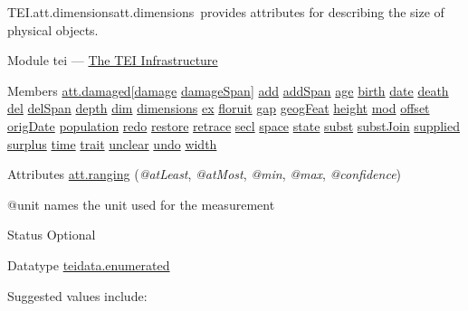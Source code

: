\begin{reflist}
\item[]\begin{specHead}{TEI.att.dimensions}{att.dimensions} provides attributes for describing the size of physical objects.\end{specHead} 
    \item[{Module}]
  tei — \hyperref[ST]{The TEI Infrastructure}
    \item[{Members}]
  \hyperref[TEI.att.damaged]{att.damaged}[\hyperref[TEI.damage]{damage} \hyperref[TEI.damageSpan]{damageSpan}] \hyperref[TEI.add]{add} \hyperref[TEI.addSpan]{addSpan} \hyperref[TEI.age]{age} \hyperref[TEI.birth]{birth} \hyperref[TEI.date]{date} \hyperref[TEI.death]{death} \hyperref[TEI.del]{del} \hyperref[TEI.delSpan]{delSpan} \hyperref[TEI.depth]{depth} \hyperref[TEI.dim]{dim} \hyperref[TEI.dimensions]{dimensions} \hyperref[TEI.ex]{ex} \hyperref[TEI.floruit]{floruit} \hyperref[TEI.gap]{gap} \hyperref[TEI.geogFeat]{geogFeat} \hyperref[TEI.height]{height} \hyperref[TEI.mod]{mod} \hyperref[TEI.offset]{offset} \hyperref[TEI.origDate]{origDate} \hyperref[TEI.population]{population} \hyperref[TEI.redo]{redo} \hyperref[TEI.restore]{restore} \hyperref[TEI.retrace]{retrace} \hyperref[TEI.secl]{secl} \hyperref[TEI.space]{space} \hyperref[TEI.state]{state} \hyperref[TEI.subst]{subst} \hyperref[TEI.substJoin]{substJoin} \hyperref[TEI.supplied]{supplied} \hyperref[TEI.surplus]{surplus} \hyperref[TEI.time]{time} \hyperref[TEI.trait]{trait} \hyperref[TEI.unclear]{unclear} \hyperref[TEI.undo]{undo} \hyperref[TEI.width]{width}
    \item[{Attributes}]
  \hyperref[TEI.att.ranging]{att.ranging} (\textit{@atLeast}, \textit{@atMost}, \textit{@min}, \textit{@max}, \textit{@confidence}) \hfil\\[-10pt]\begin{sansreflist}
    \item[@unit]
  names the unit used for the measurement
\begin{reflist}
    \item[{Status}]
  Optional
    \item[{Datatype}]
  \hyperref[TEI.teidata.enumerated]{teidata.enumerated}
    \item[{Suggested values include:}]
  \begin{description}


\end{description}
\end{reflist}
\end{sansreflist}
\end{reflist}
